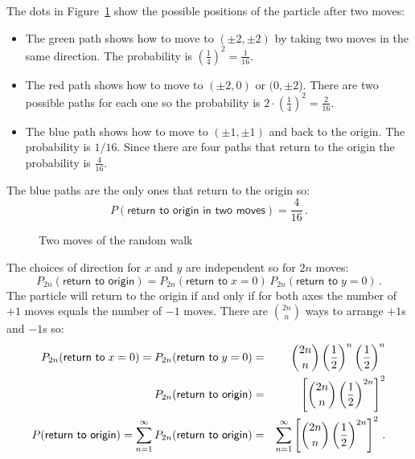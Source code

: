 \solution{}

The dots in Figure~\ref{f.two-moves} show the possible positions of the particle after two moves:
\begin{itemize}
\item The green path shows how to move to $(\pm 2, \pm 2)$ by taking two moves in the same direction. The probability is $\left(\frac{1}{4}\right)^2= \frac{1}{16}$.
\item The red path shows how to move to $(\pm 2,0)$ or $(0,\pm 2$). There are two possible paths for each one so the probability is $2\cdot\left(\frac{1}{4}\right)^2= \frac{2}{16}$.
\item The blue path shows how to move to $(\pm 1,\pm 1)$ and back to the origin. The probability is $1/16$. Since there are four paths that return to the origin the probability is $\frac{4}{16}$.
\end{itemize}
The blue paths are the only ones that return to the origin so:
\[
P(\textsf{return to origin in two moves})=\frac{4}{16}\,.
\]

\begin{figure}[tb]
\begin{center}
\end{center}
\caption{Two moves of the random walk}\label{f.two-moves}
\end{figure}

 The choices of direction for $x$ and $y$ are independent so for $2n$ moves:
\begin{equation}\label{eq.2d-1}
P_{2n}(\textsf{return to origin}) =
P_{2n}(\textsf{return to}\;x=0)\,P_{2n}(\textsf{return to}\;y=0)\,.
\end{equation}
The particle will return to the origin if and only if for both axes the number of $+1$ moves equals the number of $-1$ moves. There are ${2n \choose n}$ ways to arrange $+1$s and $-1$s so:
\begin{eqnarray}
P_{2n}(\textsf{return to}\;x=0) =P_{2n}(\textsf{return to}\;y=0)&=&
\displaystyle{2n \choose n}\left(\displaystyle\frac{1}{2}\right)^n\left(\displaystyle\frac{1}{2}\right)^{n}\\
P_{2n}(\textsf{return to origin}) &=&
\left[\displaystyle{2n \choose n}\left(\displaystyle\frac{1}{2}\right)^{2n}\right]^2\\
P(\textsf{return to origin}) =
\sum_{n=1}^{\infty}P_{2n}(\textsf{return to origin}) &=&
\sum_{n=1}^{\infty}\left[\displaystyle{2n \choose n}\left(\displaystyle\frac{1}{2}\right)^{2n}\right]^2\,.\label{eq.2d-2}
\end{eqnarray}

